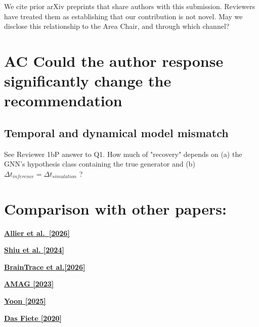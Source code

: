 \documentclass[11pt]{article}
\begin{document}
We cite prior arXiv preprints that share authors with this submission. Reviewers have treated them as establishing that our contribution is not novel. May we disclose this relationship to the Area Chair, and through which channel?

\section{AC Could the author response significantly change the recommendation}

\subsection{}

\subsection{}

\subsection{}

\subsection{Temporal and dynamical model mismatch}
See Reviewer 1bP answer to Q1. How much of "recovery" depends on (a) the GNN's hypothesis class containing the true generator and (b) $\Delta t_{inference} = \Delta t_{simulation}$ ? 




\subsection{}


\section{Comparison with other papers:}

\hyperref[link8]{\textbf{Allier et al.\ [2026]}}

\hyperref[link9]{\textbf{Shiu et al. [2024]}}

\hyperref[link10]{\textbf{BrainTrace et al.[2026]}}

\hyperref[link11]{\textbf{AMAG [2023]}}

\hyperref[link12]{\textbf{Yoon [2025]}}

\hyperref[link13]{\textbf{Das Fiete [2020]}}
\end{document}
